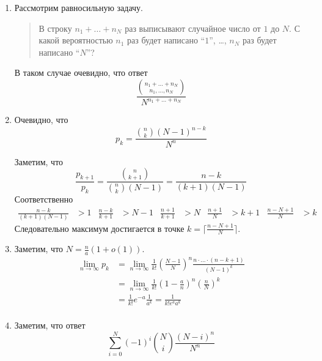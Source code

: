 \documentclass[12pt,a4paper]{article}
\begin{document}
    \begin{problem}{23}
        \begin{enumerate}
            \item Рассмотрим равносильную задачу.
                \begin{quotation}
                    В строку $n_1 + \dots + n_N$ раз выписывают случайное число от $1$ до $N$. С какой вероятностью $n_1$ раз будет написано ``$1$'', \dots, $n_N$ раз будет написано ``$N$''?
                \end{quotation}
                
                В таком случае очевидно, что ответ
                \[\frac{\binom{n_1 + \dots + n_N}{n_1, \dots, n_N}}{N^{n_1 + \dots + n_N}}\]

            \item Очевидно, что
                \[p_k = \frac{\binom{n}{k} (N-1)^{n - k}}{N^n}\]

                Заметим, что
                \[
                    \frac{p_{k+1}}{p_k}
                    = \frac{\binom{n}{k+1}}{\binom{n}{k} (N-1)}
                    = \frac{n-k}{(k+1) (N-1)}
                \]
                Соответственно
                \begin{align*}
                    \frac{n-k}{(k+1)(N-1)} &> 1&
                    \frac{n-k}{k+1} &> N - 1&
                    \frac{n+1}{k+1} &> N&
                    \frac{n+1}{N} &> k+1&
                    \frac{n-N+1}{N} &> k&
                \end{align*}
                Следовательно максимум достигается в точке $k = \lceil \frac{n-N+1}{N} \rceil$.

            \item Заметим, что $N = \frac{n}{a}(1 + o(1))$.
                \begin{align*}
                        \lim_{n \to \infty} p_k
                        &= \lim_{n \to \infty} \frac{1}{k!} \left(\frac{N-1}{N}\right)^n \frac{n \cdot \dots \cdot (n-k+1)}{(N-1)^k}\\
                        &= \lim_{n \to \infty} \frac{1}{k!} \left(1 - \frac{a}{n}\right)^n \left(\frac{n}{N}\right)^k\\
                        &= \frac{1}{k!} e^{-a} \frac{1}{a^k} = \frac{1}{k! e^a a^k}\\
                \end{align*}

            \item Заметим, что ответ
                \[\sum_{i=0}^N (-1)^i \binom{N}{i} \frac{(N-i)^n}{N^n}\]


\end{enumerate}
\end{problem}
\end{document}
